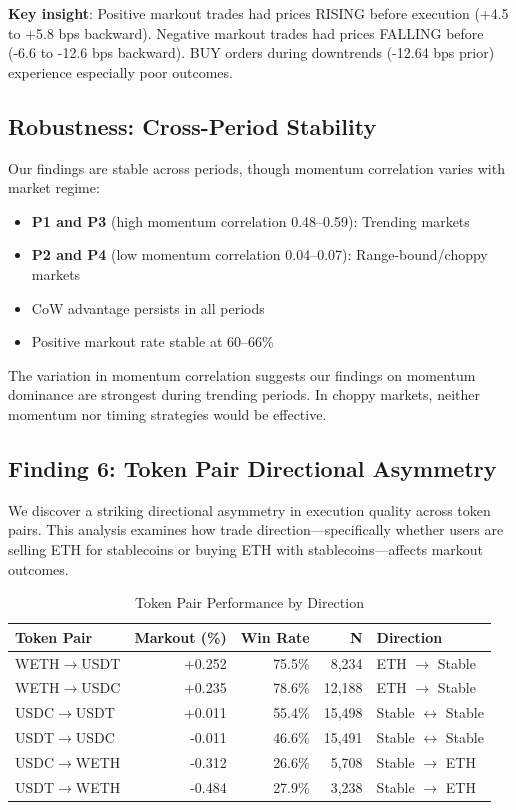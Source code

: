 \documentclass[12pt,a4paper]{article}
\begin{document}
\textbf{Key insight}: Positive markout trades had prices RISING before execution (+4.5 to +5.8 bps backward). Negative markout trades had prices FALLING before (-6.6 to -12.6 bps backward). BUY orders during downtrends (-12.64 bps prior) experience especially poor outcomes.

\subsection{Robustness: Cross-Period Stability}

Our findings are stable across periods, though momentum correlation varies with market regime:

\begin{itemize}
    \item \textbf{P1 and P3} (high momentum correlation 0.48--0.59): Trending markets
    \item \textbf{P2 and P4} (low momentum correlation 0.04--0.07): Range-bound/choppy markets
    \item CoW advantage persists in all periods
    \item Positive markout rate stable at 60--66\%
\end{itemize}

The variation in momentum correlation suggests our findings on momentum dominance are strongest during trending periods. In choppy markets, neither momentum nor timing strategies would be effective.

\subsection{Finding 6: Token Pair Directional Asymmetry}

We discover a striking directional asymmetry in execution quality across token pairs. This analysis examines how trade direction---specifically whether users are selling ETH for stablecoins or buying ETH with stablecoins---affects markout outcomes.

\begin{table}[H]
\centering
\caption{Token Pair Performance by Direction}
\label{tab:token_pair}
\begin{tabular}{lrrrl}
\toprule
\textbf{Token Pair} & \textbf{Markout (\%)} & \textbf{Win Rate} & \textbf{N} & \textbf{Direction} \\
\midrule
WETH$\rightarrow$USDT & +0.252 & 75.5\% & 8,234 & ETH $\rightarrow$ Stable \\
WETH$\rightarrow$USDC & +0.235 & 78.6\% & 12,188 & ETH $\rightarrow$ Stable \\
USDC$\rightarrow$USDT & +0.011 & 55.4\% & 15,498 & Stable $\leftrightarrow$ Stable \\
USDT$\rightarrow$USDC & -0.011 & 46.6\% & 15,491 & Stable $\leftrightarrow$ Stable \\
USDC$\rightarrow$WETH & -0.312 & 26.6\% & 5,708 & Stable $\rightarrow$ ETH \\
USDT$\rightarrow$WETH & -0.484 & 27.9\% & 3,238 & Stable $\rightarrow$ ETH \\
\bottomrule
\end{tabular}
\end{table}
\end{document}
